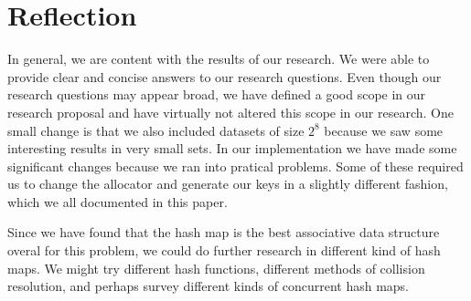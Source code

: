 \documentclass[12pt,a4paper]{article}
\begin{document}
    \section{Reflection}
    In general, we are content with the results of our research. We were able to provide clear and concise answers to our
    research questions. Even though our research questions may appear broad, we have defined a good scope in our research
    proposal and have virtually not altered this scope in our research. One small change is that we also included datasets of
    size $2^8$ because we saw some interesting results in very small sets. In our implementation we have made some significant
    changes because we ran into pratical problems. Some of these required us to change the allocator and generate our keys
    in a slightly different fashion, which we all documented in this paper.
    
    Since we have found that the hash map is the best associative data structure overal for this problem, we could do further
    research in different kind of hash maps. We might try different hash functions, different methods of collision resolution,
    and perhaps survey different kinds of concurrent hash maps.

    

    
\end{document}

